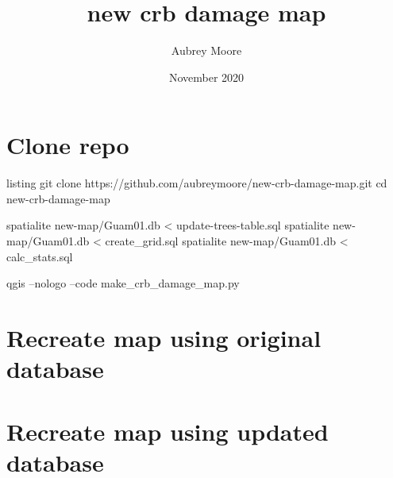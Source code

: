 \documentclass{scrartcl}
\title{new crb damage map}
\author{Aubrey Moore}
\date{November 2020}
\begin{document}
\maketitle

\section{Clone repo}

\begin{listing}{listing}
  git clone https://github.com/aubreymoore/new-crb-damage-map.git
  cd new-crb-damage-map
\end{listing}





\begin{listing}
	spatialite new-map/Guam01.db < update-trees-table.sql
        spatialite new-map/Guam01.db < create_grid.sql
        spatialite new-map/Guam01.db < calc_stats.sql
\end{listing}

qgis --nologo --code make_crb_damage_map.py

\section{Recreate map using original database}

\section{Recreate map using updated database}
\end{document}
